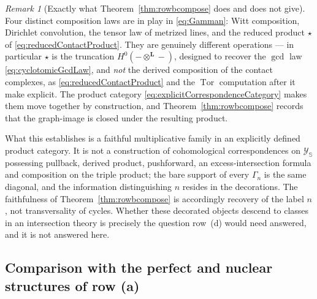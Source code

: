 \documentclass[11pt]{amsart}
\theoremstyle{definition}
\theoremstyle{remark}
\newtheorem{remark}[theorem]{Remark}
\begin{document}
\begin{remark}[Exactly what Theorem~\ref{thm:rowbcompose} does and does not
give]\label{rem:rowbscope}
Four distinct composition laws are in play in \eqref{eq:Gamman}: Witt
composition, Dirichlet convolution, the tensor law of metrized lines, and
the reduced product $\star$ of \eqref{eq:reducedContactProduct}.  They are
genuinely different operations --- in particular $\star$ is the truncation
$H^0(-\otimes^{\mathbf L}-)$, designed to recover the $\gcd$ law
\eqref{eq:cyclotomicGcdLaw}, and \emph{not} the derived composition of the
contact complexes, as \eqref{eq:reducedContactProduct} and the
$\operatorname{Tor}$ computation after it make explicit.  The product
category \eqref{eq:explicitCorrespondenceCategory} makes them move together
by construction, and Theorem~\ref{thm:rowbcompose} records that the
graph-image is closed under the resulting product.

What this establishes is a faithful multiplicative family in an explicitly
defined product category.  It is not a construction of cohomological
correspondences on $\mathscr Y_{\mathbb S}$ possessing pullback, derived
product, pushforward, an excess-intersection formula and composition on the
triple product; the bare support of every $\Gamma_n$ is the same diagonal,
and the information distinguishing $n$ resides in the decorations.  The
faithfulness of Theorem~\ref{thm:rowbcompose} is accordingly recovery of the
label $n$, not transversality of cycles.  Whether these decorated objects
descend to classes in an intersection theory is precisely the question
row~(d) would need answered, and it is not answered here.
\end{remark}

\subsection{Comparison with the perfect and nuclear structures of row (a)}
\end{document}
